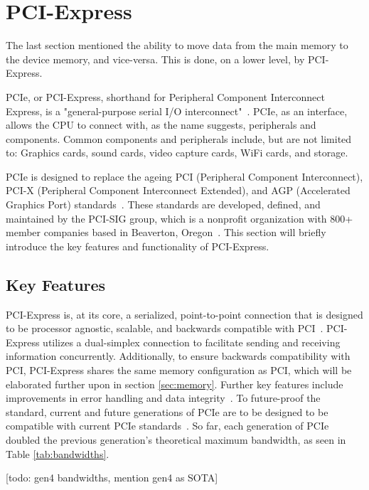  
 
\section{PCI-Express}
The last section mentioned the ability to move data from the main memory to the device memory, and vice-versa. This is done, on a lower level, by PCI-Express. 

PCIe, or PCI-Express, shorthand for Peripheral Component Interconnect Express, is a "general-purpose serial I/O interconnect"~\cite{pci-sig_pci_2011}. PCIe, as an interface, allows the CPU to connect with, as the name suggests, peripherals and components. Common components and peripherals include, but are not limited to: Graphics cards, sound cards, video capture cards, WiFi cards, and storage.

PCIe is designed to replace the ageing PCI (Peripheral Component Interconnect), PCI-X (Peripheral Component Interconnect Extended), and AGP (Accelerated Graphics Port) standards~\cite{verma_pcie_2017}. These standards are developed, defined, and maintained by the PCI-SIG group, which is a nonprofit organization with 800+ member companies based in Beaverton, Oregon~\cite{pci-sig_contact_2022}. This section will briefly introduce the key features and functionality of PCI-Express.

\subsection{Key Features}

PCI-Express is, at its core, a serialized, point-to-point connection that is designed to be processor agnostic, scalable, and backwards compatible with PCI~\cite{lawley_understanding_2014, pci-sig_pci_2011, pci-sig_membership_2022}. PCI-Express utilizes a dual-simplex connection to facilitate sending and receiving information concurrently. Additionally, to ensure backwards compatibility with PCI, PCI-Express shares the same memory configuration as PCI, which will be elaborated further upon in section \ref{sec:memory}. Further key features include improvements in error handling and data integrity~\cite{verma_pcie_2017}. To future-proof the standard, current and future generations of PCIe are to be designed to be compatible with current PCIe standards~\cite{pci-sig_membership_2022}. So far, each generation of PCIe doubled the previous generation's theoretical maximum bandwidth, as seen in Table \ref{tab:bandwidths}.

[todo: gen4 bandwidths, mention gen4 as SOTA]

